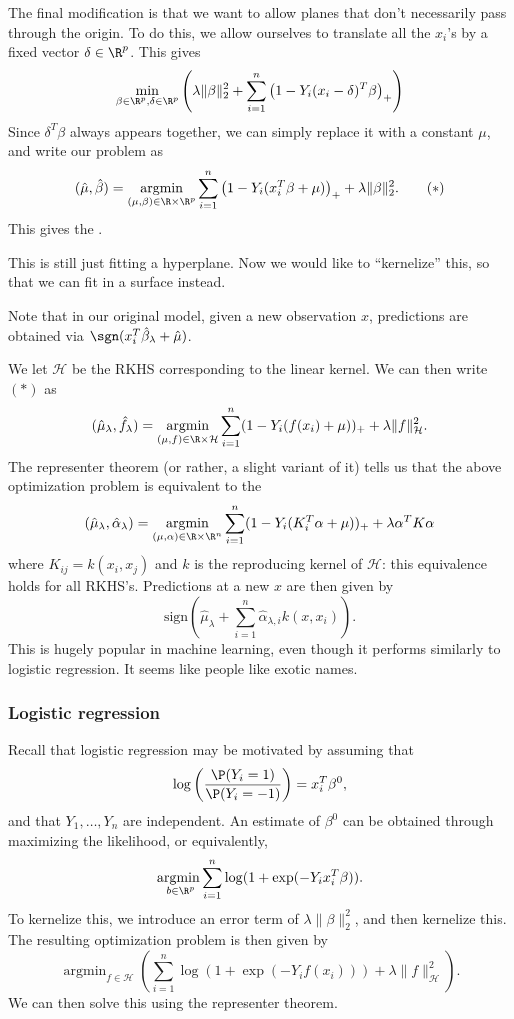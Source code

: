 \documentclass[a4paper]{article}
\DeclareMathOperator*\argmin{argmin}
\begin{document}
The final modification is that we want to allow planes that don't necessarily pass through the origin. To do this, we allow ourselves to translate all the $x_i$'s by a fixed vector $\delta \in \R^p$. This gives
\[
  \min_{\beta \in \R^p, \delta \in \R^p} \left(\lambda \|\beta\|_2^2 + \sum_{i = 1}^n \left(1 - Y_i (x_i - \delta)^T \beta\right)_+\right)
\]
Since $\delta^T \beta$ always appears together, we can simply replace it with a constant $\mu$, and write our problem as
\[
  (\hat{\mu}, \hat{\beta}) = \argmin_{(\mu, \beta) \in \R \times \R^p} \sum_{i = 1}^n \left(1 - Y_i (x_i^T \beta + \mu)\right)_+ + \lambda \|\beta\|_2^2.\tag{$*$}
\]
This gives the .

This is still just fitting a hyperplane. Now we would like to ``kernelize'' this, so that we can fit in a surface instead.

Note that in our original model, given a new observation $x$, predictions are obtained via $\sgn(x_i^T \hat{\beta}_\lambda + \hat{\mu})$.

We let $\mathcal{H}$ be the RKHS corresponding to the linear kernel. We can then write $(*)$ as
\[
  (\hat{\mu}_\lambda, \hat{f}_\lambda) = \argmin_{(\mu, f) \in \R \times \mathcal{H}} \sum_{i = 1}^n (1 - Y_i( f(x_i) + \mu))_+ + \lambda \|f\|_{\mathcal{H}}^2.
\]
The representer theorem (or rather, a slight variant of it) tells us that the above optimization problem is equivalent to the 
\[
  (\hat{\mu}_\lambda, \hat{\alpha}_\lambda) = \argmin_{(\mu, \alpha) \in \R \times \R^n}\sum_{i = 1}^n (1 - Y_i (K_i^T \alpha + \mu))_+ + \lambda \alpha^T K \alpha
\]
where $K_{ij} = k(x_i, x_j)$ and $k$ is the reproducing kernel of $\mathcal{H}$: this equivalence holds for all RKHS's. Predictions at a new $x$ are then given by
\[
  \mathrm{sign} (\hat{\mu}_\lambda + \sum_{i = 1}^n \hat{\alpha}_{\lambda, i} k(x, x_i)).
\]
This is hugely popular in machine learning, even though it performs similarly to logistic regression. It seems like people like exotic names.
\subsubsection*{Logistic regression}
Recall that logistic regression may be motivated by assuming that
\[
  \log \left(\frac{\P(Y_i = 1)}{\P(Y_i = -1)}\right) = x_i^T \beta^0,
\]
and that $Y_1, \ldots, Y_n$ are independent. An estimate of $\beta^0$ can be obtained through maximizing the likelihood, or equivalently,
\[
  \argmin_{~b \in \R^p} \sum_{i = 1}^n \log (1 + \exp(-Y_i x_i^T \beta)).
\]
To kernelize this, we introduce an error term of $\lambda \|\beta\|_2^2$, and then kernelize this. The resulting optimization problem is then given by
\[
  \argmin_{f \in \mathcal{H}} \left( \sum_{i = 1}^n \log (1 + \exp (-Y_i f(x_i))) + \lambda \|f\|_{\mathcal{H}}^2\right).
\]
We can then solve this using the representer theorem.
\end{document}
